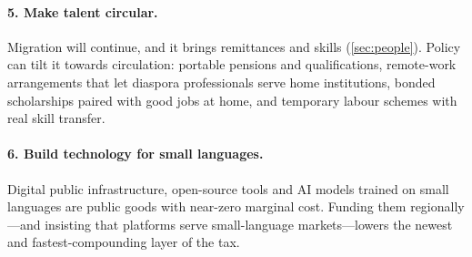 \paragraph{5. Make talent circular.} Migration will continue, and it brings
remittances and skills (\cref{sec:people}). Policy can tilt it towards
circulation: portable pensions and qualifications, remote-work arrangements
that let diaspora professionals serve home institutions, bonded scholarships
paired with good jobs at home, and temporary labour schemes with real skill
transfer.

\paragraph{6. Build technology for small languages.} Digital public
infrastructure, open-source tools and AI models trained on small languages
are public goods with near-zero marginal cost. Funding them regionally---and
insisting that platforms serve small-language markets---lowers the newest and
fastest-compounding layer of the tax.
